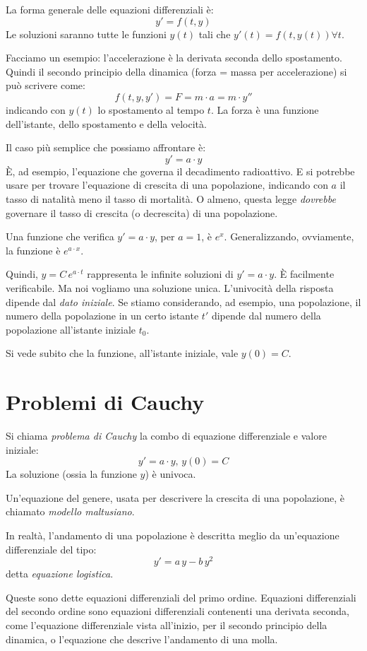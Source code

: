 La forma generale delle equazioni differenziali \`e:
\[
y' = f(t,y)
\]
Le soluzioni saranno tutte le funzioni $y(t)$ tali che $y'(t) = f(t, y(t)) \forall t$.

Facciamo un esempio: l'accelerazione \`e la derivata seconda dello spostamento. Quindi il secondo principio della dinamica (forza = massa per accelerazione) si pu\`o scrivere come:
\[
f(t, y, y') = F = m \cdot a = m \cdot y''
\]
indicando con $y(t)$ lo spostamento al tempo $t$. La forza \`e una funzione dell'istante, dello spostamento e della velocit\`a.

Il caso pi\`u semplice che possiamo affrontare \`e:
\[
y' = a \cdot y
\]
\`E, ad esempio, l'equazione che governa il decadimento radioattivo. E si potrebbe usare per trovare l'equazione di crescita di una popolazione, indicando con $a$ il tasso di natalit\`a meno il tasso di mortalit\`a. O almeno, questa legge \emph{dovrebbe} governare il tasso di crescita (o decrescita) di una popolazione.

Una funzione che verifica $y' = a \cdot y$, per $a = 1$, \`e $e^x$. Generalizzando, ovviamente, la funzione \`e $e^{a \cdot x}$.

Quindi, $y = C \, e^{a \cdot t}$ rappresenta le infinite soluzioni di $y' = a \cdot y$. \`E facilmente verificabile. Ma noi vogliamo una soluzione unica. L'univocit\`a della risposta dipende dal \emph{dato iniziale}. Se stiamo considerando, ad esempio, una popolazione, il numero della popolazione in un certo istante $t'$ dipende dal numero della popolazione all'istante iniziale $t_0$.

Si vede subito che la funzione, all'istante iniziale, vale $y(0) = C$.

\section{Problemi di Cauchy}

Si chiama \emph{problema di Cauchy} la combo di equazione differenziale e valore iniziale:
\[
y' = a \cdot y , \, y(0) = C
\]
La soluzione (ossia la funzione $y$) \`e univoca.

Un'equazione del genere, usata per descrivere la crescita di una popolazione, \`e chiamato \emph{modello maltusiano}.

In realt\`a, l'andamento di una popolazione \`e descritta meglio da un'equazione differenziale del tipo:
\[
y' = a \, y - b \, y^2
\]
detta \emph{equazione logistica}.

Queste sono dette equazioni differenziali del primo ordine. Equazioni differenziali del secondo ordine sono equazioni differenziali contenenti una derivata seconda, come l'equazione differenziale vista all'inizio, per il secondo principio della dinamica, o l'equazione che descrive l'andamento di una molla.

